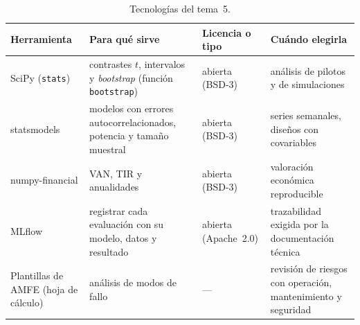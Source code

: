 \begin{table}[h]
\centering\small
\caption{Tecnologías del tema~5.}\label{tab:tec5}
\begin{tabularx}{\textwidth}{@{}>{\raggedright\arraybackslash}p{2.5cm}>{\raggedright\arraybackslash}X>{\raggedright\arraybackslash}p{2.1cm}>{\raggedright\arraybackslash}X@{}}
\toprule
Herramienta & Para qué sirve & Licencia o tipo & Cuándo elegirla \\
\midrule
SciPy (\texttt{stats}) & contrastes $t$, intervalos y \emph{bootstrap} (función \texttt{bootstrap}) & abierta (BSD-3) & análisis de pilotos y de simulaciones \\
statsmodels & modelos con errores autocorrelacionados, potencia y tamaño muestral & abierta (BSD-3) & series semanales, diseños con covariables \\
numpy-financial & VAN, TIR y anualidades & abierta (BSD-3) & valoración económica reproducible \\
MLflow~\cite{mlflow} & registrar cada evaluación con su modelo, datos y resultado & abierta (Apache~2.0) & trazabilidad exigida por la documentación técnica \\
Plantillas de AMFE (hoja de cálculo) & análisis de modos de fallo & --- & revisión de riesgos con operación, mantenimiento y seguridad \\
\bottomrule
\end{tabularx}
\end{table}

\addtocounter{definicion}{1}%

